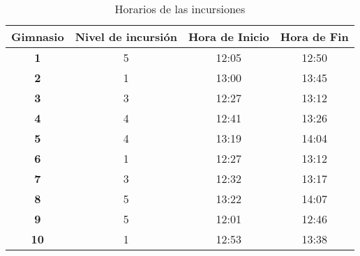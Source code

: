 \documentclass[10pt,letterpaper,twoside,openright]{article}
\begin{document}
	\begin{table}[h!]
	\centering
	\begin{adjustbox}{max width=\textwidth}
	\begin{tabular}{c||ccc}
	\textbf{Gimnasio} & \textbf{Nivel de incursión} & \textbf{Hora de Inicio} & \textbf{Hora de Fin} \\ 
	\hline 
	\hline
	\textbf{1} & 5 & 12:05 & 12:50 \\ 
	\hline 
	\textbf{2} & 1 & 13:00 & 13:45 \\ 
	\hline 
	\textbf{3} & 3 & 12:27 & 13:12 \\ 
	\hline 
	\textbf{4} & 4 & 12:41 & 13:26 \\ 
	\hline 
	\textbf{5} & 4 & 13:19 & 14:04 \\ 
	\hline 
	\textbf{6} & 1 & 12:27 & 13:12 \\ 
	\hline 
	\textbf{7} & 3 & 12:32 & 13:17 \\ 
	\hline 
	\textbf{8} & 5 & 13:22 & 14:07 \\ 
	\hline 
	\textbf{9} & 5 & 12:01 & 12:46 \\ 
	\hline 
	\textbf{10} & 1 & 12:53 & 13:38 \\ 
	\hline 
	\end{tabular} 	
	\end{adjustbox}
	\caption{Horarios de las incursiones}
	\label{tab:incursiones}
	\end{table}
\end{document}
